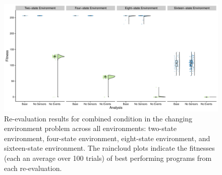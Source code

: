 \begin{figure}[h]
  \includegraphics[width=\columnwidth]
  {chapters/04-evolving-event-driven-programs-with-signalgp/media/chg-env-combined-strategy.pdf}
  \caption{\small 
  Re-evaluation results for combined condition in the changing environment problem across all environments:  two-state environment, four-state environment, eight-state environment, and sixteen-state environment. 
  The raincloud plots indicate the fitnesses (each an average over 100 trials) of best performing programs from each re-evaluation.
  }
  \label{chapter:signalgp:fig:combined-reeval}
\end{figure}